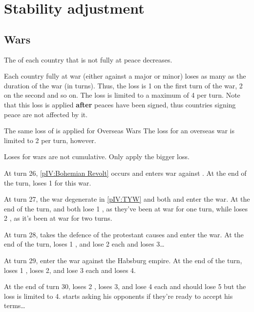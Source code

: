 \section{Stability adjustment}\label{chPeace:Stability}
\subsection{Wars}
\aparag The \STAB of each country that is not fully at peace decreases.

\bparag Each country fully at war (either against a major or minor) loses as
many \STAB as the duration of the war (in turns).
\bparag Thus, the loss is 1 \STAB on the first turn of the war, 2 on the
second and so on.
\bparag The loss is limited to a maximum of 4 \STAB per turn.
\bparag Note that this loss is applied \textbf{after} peaces have been signed,
thus countries signing peace are not affected by it.

\bparag The same loss of \STAB is applied for Overseas Wars
\bparag The loss for an overseas war is limited to 2 \STAB per turn, however.

 Loses for wars are not cumulative. Only apply the
bigger loss.

\begin{exemple}
  At turn 26, \ref{pIV:Bohemian Revolt} occurs and \AUS enters war against
  \paysBoheme. At the end of the turn, \AUS loses 1 \STAB for this war.

  At turn 27, the war degenerate in \ref{pIV:TYW} and both \HIS and \HOL enter
  the war. At the end of the turn, \HIS and \HOL both lose 1 \STAB, as they've
  been at war for one turn, while \AUS loses 2 \STAB, as it's been at war for
  two turns.

  At turn 28, \SUE takes the defence of the protestant causes and enter the
  war. At the end of the turn, \SUE loses 1 \STAB, \HIS and \HOL lose 2 each
  and \AUS loses 3\ldots

  At turn 29, \FRA enter the war against the Habsburg empire. At the end of
  the turn, \FRA loses 1 \STAB, \SUE loses 2, \HIS and \HOL lose 3 each and
  \AUS loses 4.

  At the end of turn 30, \FRA loses 2 \STAB, \SUE loses 3, \HOL and \HIS lose
  4 each and \AUS should lose 5 but the loss is limited to
  4. \ministreRichelieu starts asking his opponents if they're ready to accept
  his terms\ldots
\end{exemple}

